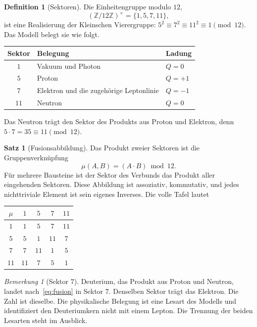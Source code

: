 \documentclass[11pt,a4paper]{article}
\theoremstyle{definition}
\newtheorem{definition}{Definition}[section]
\newtheorem{satz}{Satz}[section]
\theoremstyle{remark}
\newtheorem{bemerkung}{Bemerkung}[section]
\begin{document}
\begin{definition}[Sektoren]
Die Einheitengruppe modulo \(12\),
\begin{equation}
(\mathbb{Z}/12\mathbb{Z})^{\times}=\{1,5,7,11\},
\end{equation}
ist eine Realisierung der Kleinschen Vierergruppe: \(5^2\equiv 7^2\equiv 11^2\equiv 1\pmod{12}\). Das Modell belegt sie wie folgt.
\begin{center}
\begin{tabular}{@{}cll@{}}
\toprule
Sektor & Belegung & Ladung \\
\midrule
\(1\)  & Vakuum und Photon & \(Q=0\) \\
\(5\)  & Proton & \(Q=+1\) \\
\(7\)  & Elektron und die zugehörige Leptonlinie & \(Q=-1\) \\
\(11\) & Neutron & \(Q=0\) \\
\bottomrule
\end{tabular}
\end{center}
Das Neutron trägt den Sektor des Produkts aus Proton und Elektron, denn \(5\cdot 7=35\equiv 11\pmod{12}\).
\end{definition}

\begin{satz}[Fusionsabbildung]
\label{satz:fusion}
Das Produkt zweier Sektoren ist die Gruppenverknüpfung
\begin{equation}
\label{eq:fusion}
\mu(A,B)=(A\cdot B)\bmod 12.
\end{equation}
Für mehrere Bausteine ist der Sektor des Verbunds das Produkt aller eingehenden Sektoren. Diese Abbildung ist assoziativ, kommutativ, und jedes nichttriviale Element ist sein eigenes Inverses. Die volle Tafel lautet
\begin{center}
\begin{tabular}{@{}c|cccc@{}}
\(\mu\) & \(1\) & \(5\) & \(7\) & \(11\) \\
\hline
\(1\) & \(1\) & \(5\) & \(7\) & \(11\) \\
\(5\) & \(5\) & \(1\) & \(11\) & \(7\) \\
\(7\) & \(7\) & \(11\) & \(1\) & \(5\) \\
\(11\) & \(11\) & \(7\) & \(5\) & \(1\) \\
\end{tabular}
\end{center}
\end{satz}

\begin{bemerkung}[Sektor \(7\)]
Deuterium, das Produkt aus Proton und Neutron, landet nach~\eqref{eq:fusion} in Sektor \(7\). Denselben Sektor trägt das Elektron. Die Zahl ist dieselbe. Die physikalische Belegung ist eine Lesart des Modells und identifiziert den Deuteriumkern nicht mit einem Lepton. Die Trennung der beiden Lesarten steht im Ausblick.
\end{bemerkung}
\end{document}
